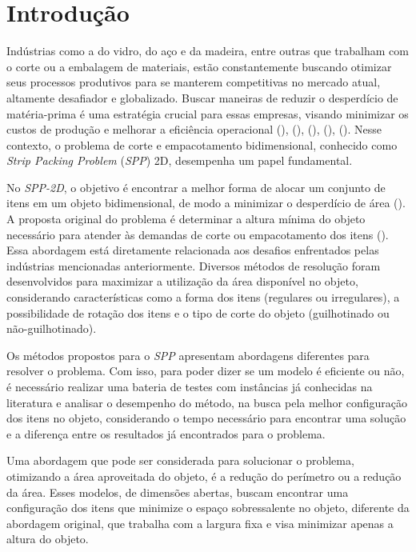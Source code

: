 \section{Introdução}
    
    Indústrias como a do vidro, do aço e da madeira, entre outras que trabalham com o corte ou a embalagem de materiais, estão constantemente buscando otimizar seus processos produtivos para se manterem competitivas no mercado atual, altamente desafiador e globalizado. Buscar maneiras de reduzir o desperdício de matéria-prima é uma estratégia crucial para essas empresas, visando minimizar os custos de produção e melhorar a eficiência operacional (\cite{Morabito1998}), (\cite{hopper2000two}), (\cite{Morabito2000}), (\cite{Cintra2007}), (\cite{Parreno2021}). Nesse contexto, o problema de corte e empacotamento bidimensional, conhecido como \emph{Strip Packing Problem} (\emph{SPP}) 2D, desempenha um papel fundamental.

    No \emph{SPP-2D}, o objetivo é encontrar a melhor forma de alocar um conjunto de itens em um objeto bidimensional, de modo a minimizar o desperdício de área (\cite{hopper2000two}). A proposta original do problema é determinar a altura mínima do objeto necessário para atender às demandas de corte ou empacotamento dos itens (\cite{Cherri2009}). Essa abordagem está diretamente relacionada aos desafios enfrentados pelas indústrias mencionadas anteriormente. Diversos métodos de resolução foram desenvolvidos para maximizar a utilização da área disponível no objeto, considerando características como a forma dos itens (regulares ou irregulares), a possibilidade de rotação dos itens e o tipo de corte do objeto (guilhotinado ou não-guilhotinado).

    Os métodos propostos para o \emph{SPP} apresentam abordagens diferentes para resolver o problema. Com isso, para poder dizer se um modelo é eficiente ou não, é necessário realizar uma bateria de testes com instâncias já conhecidas na literatura e analisar o desempenho do método, na busca pela melhor configuração dos itens no objeto, considerando o tempo necessário para encontrar uma solução e a diferença entre os resultados já encontrados para o problema.

    Uma abordagem que pode ser considerada para solucionar o problema, otimizando a área aproveitada do objeto, é a redução do perímetro ou a redução da área. Esses modelos, de dimensões abertas, buscam encontrar uma configuração dos itens que minimize o espaço sobressalente no objeto, diferente da abordagem original, que trabalha com a largura fixa e visa minimizar apenas a altura do objeto.

